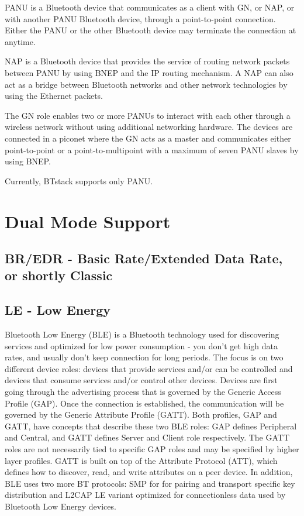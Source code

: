 PANU is a Bluetooth device that communicates as a client with GN, or NAP, or with another PANU Bluetooth device, through a point-to-point connection. Either the PANU or the other Bluetooth device may terminate the connection at anytime.

NAP is a Bluetooth device that provides the service of routing network packets between PANU by using BNEP and the IP routing mechanism. A NAP can also act as a bridge between Bluetooth networks and other network technologies by using the Ethernet packets.

The GN role enables two or more PANUs to interact with each other through a wireless network without using additional networking hardware. The devices are connected in a piconet where the GN acts as a master and communicates either point-to-point or a point-to-multipoint with a maximum of seven PANU slaves by using BNEP.

Currently, BTstack supports only PANU.

\section{Dual Mode Support}
\subsection{BR/EDR - Basic Rate/Extended Data Rate, or shortly Classic}
\subsection{LE - Low Energy}
Bluetooth Low Energy (BLE) is a Bluetooth technology used for discovering services and optimized for low power consumption - you don't get high data rates, and usually don't keep connection for long periods. The focus is on two different device roles:  devices that provide services and/or can be controlled and devices that consume services and/or control other devices. Devices are first going through the advertising process that is governed by the Generic Access Profile (GAP). Once the connection is established, the communication will be governed by the Generic Attribute Profile (GATT). Both profiles, GAP and GATT, have concepts that describe these two BLE roles:  GAP defines Peripheral and Central, and GATT defines Server and Client role respectively. The GATT roles are not necessarily tied to specific GAP roles and may be specified by higher layer profiles. GATT is built on top of the Attribute Protocol (ATT), which defines how to discover, read, and write attributes on a peer device. In addition, BLE uses two more BT protocols: SMP for for pairing and transport specific key distribution and L2CAP LE variant optimized for connectionless data used by Bluetooth Low Energy devices. 


